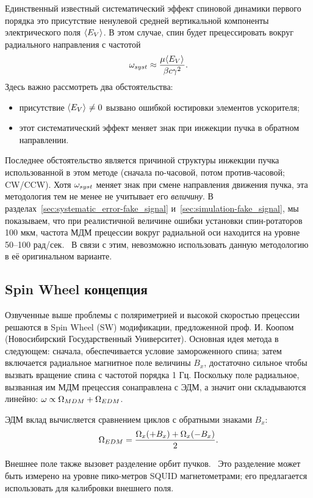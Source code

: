 Единственный известный систематический эффект спиновой динамики
первого порядка это присутствие ненулевой средней вертикальной
компоненты электрического поля $\avg{E_V}$. В этом случае, спин будет
прецессировать вокруг радиального направления с частотой~\cite[стр.~11]{BNL:Deuteron2008}
\[
\w_{syst} \approx \frac{\mu\avg{E_V}}{\beta c\gamma^2}.
\]
Здесь важно рассмотреть два обстоятельства:
\begin{itemize}
\item присутствие $\avg{E_V}\neq 0$ вызвано ошибкой юстировки
  элементов ускорителя;
\item этот систематический эффект меняет знак при инжекции пучка в
  обратном направлении.
\end{itemize}
Последнее обстоятельство является причиной структуры инжекции пучка
использованной в этом методе (сначала по-часовой, потом
против-часовой; CW/CCW). Хотя $\omega_{syst}$ меняет знак при смене
направления движения пучка, эта методология тем не менее не учитывает
его \emph{величину}. В разделах~\ref{sec:systematic_error-fake_signal} и~\ref{sec:simulation-fake_signal}, 
мы
показываем, что при реалистичной величине ошибки установки
спин-ротаторов 100 мкм, частота МДМ прецессии вокруг радиальной оси
находится на уровне 50--100 рад/сек.~\cite{Senichev:FDM} В связи с
этим, невозможно использовать данную методологию в её оригинальном варианте.

\subsection{Spin Wheel концепция}
Озвученные выше проблемы с поляриметрией и высокой скоростью прецессии
решаются в Spin Wheel (SW) модификации, предложенной проф. И. Коопом
(Новосибирский Государственный Университет). Основная идея метода в
следующем: сначала, обеспечивается условие замороженного спина; затем
включается радиальное магнитное поле величины $B_x$, достаточно сильное чтобы
вызвать вращение спина с частотой порядка 1 Гц. Поскольку поле
радиальное, вызванная им МДМ прецессия сонаправлена с ЭДМ, а значит
они складываются линейно: $\omega \propto \Omega_{MDM} + \Omega_{EDM}$.

ЭДМ вклад вычисляется сравнением циклов с обратными знаками $B_x$:~\cite[стр.~1963]{Koop:IPAC13}
\[
\Omega_{EDM} = \frac{\Omega_x(+B_x) + \Omega_x(-B_x)}{2}.
\]

Внешнее поле также вызовет разделение орбит
пучков.~\cite[стр.~1963]{Koop:IPAC13} Это разделение может быть
измерено на уровне пико-метров SQUID магнетометрами; его предлагается
использовать для калибровки внешнего поля.


